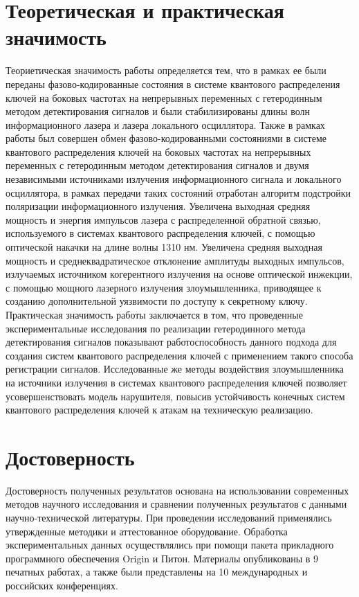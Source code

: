 \section*{Теоретическая и практическая значимость}
Теориетическая значимость работы определяется тем, что в рамках  ее  были переданы фазово-кодированные состояния в системе квантового распределения ключей на боковых частотах на непрерывных переменных с гетеродинным методом детектирования сигналов и были стабилизированы длины волн информационного лазера и лазера локального осциллятора. Также в рамках работы был совершен обмен фазово-кодированными состояниями в системе квантового распределения ключей на боковых частотах на непрерывных переменных с гетеродинным методом детектирования сигналов и двумя независимыми источниками излучения информационного сигнала и локального осциллятора, в рамках передачи таких состояний отработан алгоритм подстройки поляризации информационного излучения. Увеличена выходная средняя мощность и энергия импульсов лазера с распределенной обратной связью, используемого в системах квантового распределения ключей, с помощью оптической накачки на длине волны 1310 нм. Увеличена средняя выходная мощность и среднеквадратическое отклонение амплитуды выходных импульсов, излучаемых источником когерентного излучения на основе оптической инжекции, с помощью мощного лазерного излучения злоумышленника, приводящее к созданию дополнительной уязвимости по доступу к секретному ключу. 
Практическая значимость работы заключается в том, что проведенные экспериментальные исследования по реализации гетеродинного метода детектирования сигналов показывают работоспособность данного подхода для создания систем квантового распределения ключей с применением такого способа регистрации сигналов. Исследованные же методы воздействия злоумышленника на источники излучения в системах квантового распределения ключей позволяет усовершенствовать модель нарушителя, повысив устойчивость конечных систем квантового распределения ключей к атакам на техническую реализацию. 

\section*{Достоверность}
Достоверность полученных результатов основана на использовании современных методов научного исследования и сравнении полученных результатов с данными научно-технической литературы. При проведении исследований применялись утвержденные методики и аттестованное оборудование. Обработка экспериментальных данных осуществлялись при помощи пакета прикладного программного обеспечения Origin и Питон. Материалы опубликованы в 9 печатных работах, а также были представлены на 10 международных и российских конференциях.
